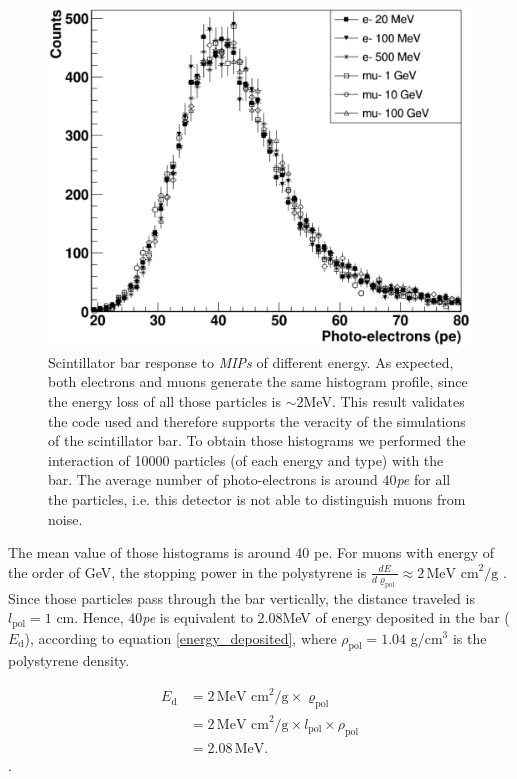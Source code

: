 \documentclass[submitting]{nst}
\begin{document}
\begin{figure}
    \centering
    \includegraphics[scale=0.24]{Figures/MIPS.png}
    \caption{Scintillator bar response to \textsl{MIPs} of different energy. As expected, both electrons and muons generate the same histogram profile, since the energy loss of all those particles is $\sim 2$MeV. This result validates the code used and therefore supports the veracity of the simulations of the scintillator bar.
    To obtain those histograms we performed the interaction of 10000 particles (of each energy and type) with the bar. The average number of photo-electrons is around $40$\textsl{pe} for all the particles, i.e. this detector is not able to distinguish muons from noise.}
    \label{fig:mips}
\end{figure}

The mean value of those histograms is around 40 pe. For muons with energy of the order of GeV, the stopping power in the polystyrene is  $\frac{dE}{d\varrho_\mathrm{pol}}\approx 2 \,\text{MeV cm}^2\text{/g}$ \cite{MichaelEtal2008}. Since those particles pass through the bar vertically, the distance traveled is $l_\mathrm{pol}=1$ cm. Hence, $40$\textsl{pe} is equivalent to $2.08$MeV of energy deposited in the bar ($E_\mathrm{d}$), according to equation \ref{energy_deposited}, where $\rho_\mathrm{pol}=1.04$ g/cm$^3$ is the polystyrene density. 

\begin{equation}
\label{energy_deposited}
\begin{split}
    E_\mathrm{d} &= 2 \,\text{MeV cm}^2\text{/g} \times \varrho_\mathrm{pol} \\
    &= 2 \,\text{MeV cm}^2\text{/g} \times l_\mathrm{pol} \times \rho_\mathrm{pol}\\
    &= \text{2.08} \, \text{MeV}.
\end{split}
\end{equation}.
\end{document}
